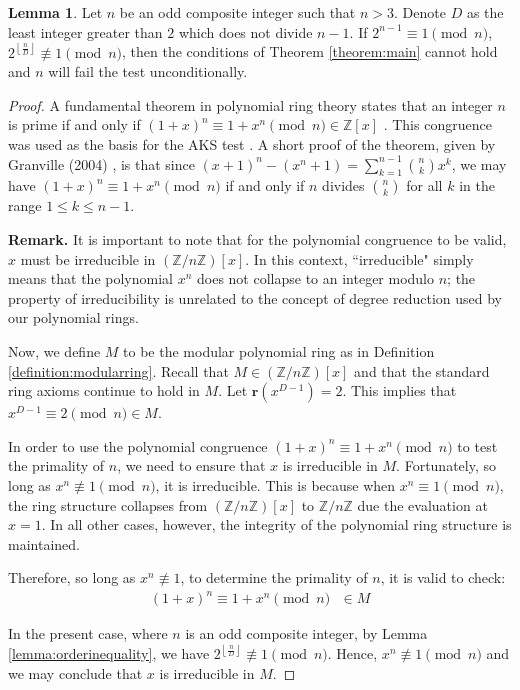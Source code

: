 \documentclass{article}
\theoremstyle{plain}
\theoremstyle{definition}
\newtheorem{lemma}{Lemma}
\newcommand{\floor}[1]{\left\lfloor #1 \right\rfloor}
\newcommand{\redu}{\textbf{r}}
\newcommand{\Z}{\mathbb{Z}}
\newcommand{\Zn}{\Z/n\Z}
\newcommand{\Mx}{M}
\begin{document}
\begin{lemma} \label{lemma:composites}
Let $n$ be an odd composite integer such that $n > 3$. Denote $D$ as the least integer greater than $2$ which does not divide $n-1$. If $2^{n-1} \equiv 1 \pmod{n}$, $2^{\floor{\frac{n}{D}}} \not\equiv 1 \pmod{n}$, then the conditions of Theorem \ref{theorem:main} cannot hold and $n$ will fail the test unconditionally.
\end{lemma}
\begin{proof}
A fundamental theorem in polynomial ring theory states that an integer $n$ is prime if and only if $(1 + x)^n \equiv 1 + x^n \pmod{n} \in \Z[x]$ \cite{granville2004primes}. This congruence was used as the basis for the AKS test \cite{aks2002}. A short proof of the theorem, given by Granville (2004) \cite{granville2004primes}, is that since $(x + 1)^n - (x^n + 1) = \sum_{k=1}^{n-1} \binom{n}{k} x^k$, we may have $(1 + x)^n \equiv 1 + x^n \pmod{n}$ if and only if $n$ divides $\binom{n}{k}$ for all $k$ in the range $1 \leq k \leq n-1$.

\textbf{Remark.} It is important to note that for the polynomial congruence to be valid, $x$ must be irreducible in $(\Zn)[x]$. In this context, ``irreducible" simply means that the polynomial $x^n$ does not collapse to an integer modulo $n$; the property of irreducibility is unrelated to the concept of degree reduction used by our polynomial rings.

Now, we define $\Mx$ to be the modular polynomial ring as in Definition \ref{definition:modularring}. Recall that $M \in (\Zn)[x]$ and that the standard ring axioms continue to hold in $\Mx$. Let $\redu(x^{D-1}) = 2$. This implies that $x^{D-1} \equiv 2 \pmod{n} \in \Mx$.

In order to use the polynomial congruence $(1 + x)^n \equiv 1 + x^n \pmod{n}$ to test the primality of $n$, we need to ensure that $x$ is irreducible in $\Mx$. Fortunately, so long as $x^n \not\equiv 1 \pmod{n}$, it is irreducible. This is because when $x^n \equiv 1 \pmod{n}$, the ring structure collapses from $(\Zn)[x]$ to $\Zn$ due the evaluation at $x=1$. In all other cases, however, the integrity of the polynomial ring structure is maintained.

Therefore, so long as $x^n \not\equiv 1$, to determine the primality of $n$, it is valid to check:
\begin{align}
    (1 + x)^n \equiv 1 + x^n \pmod{n} \text{ } \in M
\end{align}

In the present case, where $n$ is an odd composite integer, by Lemma \ref{lemma:orderinequality}, we have $2^{\floor{\frac{n}{D}}} \not\equiv 1 \pmod{n}$. Hence, $x^n \not\equiv 1 \pmod{n}$ and we may conclude that $x$ is irreducible in $M$.


\end{proof}
\end{document}
